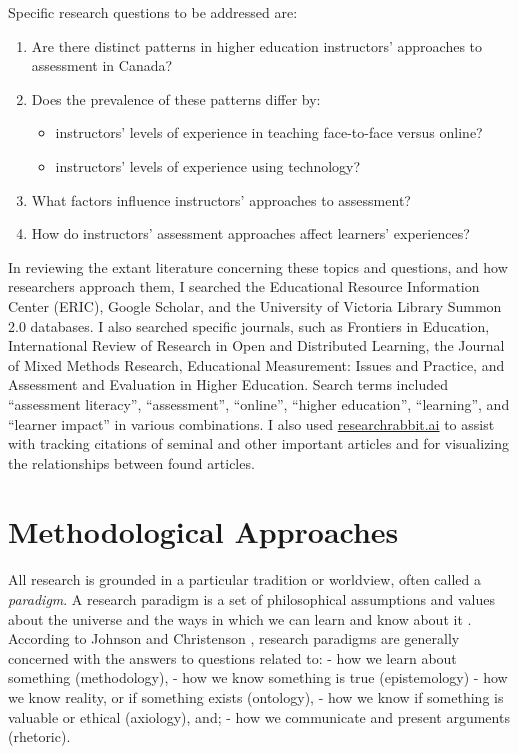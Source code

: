 \documentclass[
]{book}
\providecommand{\tightlist}{%
  \setlength{\itemsep}{0pt}\setlength{\parskip}{0pt}}
\begin{document}
Specific research questions to be addressed are:

\begin{enumerate}
\def\labelenumi{\arabic{enumi}.}
\tightlist
\item
  Are there distinct patterns in higher education instructors' approaches to assessment in Canada?
\item
  Does the prevalence of these patterns differ by:

  \begin{itemize}
  \tightlist
  \item
    instructors' levels of experience in teaching face-to-face versus online?
  \item
    instructors' levels of experience using technology?
  \end{itemize}
\item
  What factors influence instructors' approaches to assessment?
\item
  How do instructors' assessment approaches affect learners' experiences?
\end{enumerate}

In reviewing the extant literature concerning these topics and questions, and how researchers approach them, I searched the Educational Resource Information Center (ERIC), Google Scholar, and the University of Victoria Library Summon 2.0 databases. I also searched specific journals, such as Frontiers in Education, International Review of Research in Open and Distributed Learning, the Journal of Mixed Methods Research, Educational Measurement: Issues and Practice, and Assessment and Evaluation in Higher Education. Search terms included ``assessment literacy'', ``assessment'', ``online'', ``higher education'', ``learning'', and ``learner impact'' in various combinations. I also used \href{https://researchrabbit.ai}{researchrabbit.ai} to assist with tracking citations of seminal and other important articles and for visualizing the relationships between found articles.

\hypertarget{methodological-approaches}{%
\section*{Methodological Approaches}\label{methodological-approaches}}

All research is grounded in a particular tradition or worldview, often called a \emph{paradigm}. A research paradigm is a set of philosophical assumptions and values about the universe and the ways in which we can learn and know about it \citep{johnsonEducationalResearchQuantitative2017}. According to Johnson and Christenson \citeyearpar{johnsonEducationalResearchQuantitative2017}, research paradigms are generally concerned with the answers to questions related to:
- how we learn about something (methodology),
- how we know something is true (epistemology)
- how we know reality, or if something exists (ontology),
- how we know if something is valuable or ethical (axiology), and;
- how we communicate and present arguments (rhetoric).
\end{document}
